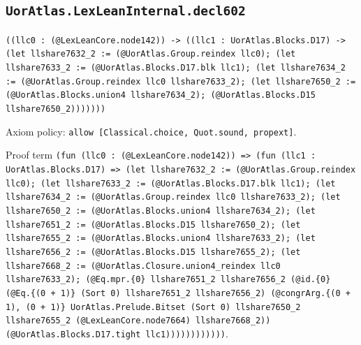 \documentclass[11pt]{article}
\begin{document}
\subsection*{\texttt{UorAtlas.LexLeanInternal.decl602}}
\noindent\texttt{((llc0 : (@LexLeanCore.node142)) -> ((llc1 : UorAtlas.Blocks.D17) -> (let llshare7632\_2 := (@UorAtlas.Group.reindex llc0); (let llshare7633\_2 := (@UorAtlas.Blocks.D17.blk llc1); (let llshare7634\_2 := (@UorAtlas.Group.reindex llc0 llshare7633\_2); (let llshare7650\_2 := (@UorAtlas.Blocks.union4 llshare7634\_2); (@UorAtlas.Blocks.D15 llshare7650\_2)))))))}\par
\noindent Axiom policy: \texttt{allow [Classical.choice, Quot.sound, propext]}.\par
\noindent Proof term \texttt{(fun (llc0 : (@LexLeanCore.node142)) => (fun (llc1 : UorAtlas.Blocks.D17) => (let llshare7632\_2 := (@UorAtlas.Group.reindex llc0); (let llshare7633\_2 := (@UorAtlas.Blocks.D17.blk llc1); (let llshare7634\_2 := (@UorAtlas.Group.reindex llc0 llshare7633\_2); (let llshare7650\_2 := (@UorAtlas.Blocks.union4 llshare7634\_2); (let llshare7651\_2 := (@UorAtlas.Blocks.D15 llshare7650\_2); (let llshare7655\_2 := (@UorAtlas.Blocks.union4 llshare7633\_2); (let llshare7656\_2 := (@UorAtlas.Blocks.D15 llshare7655\_2); (let llshare7668\_2 := (@UorAtlas.Closure.union4\_reindex llc0 llshare7633\_2); (@Eq.mpr.\{0\} llshare7651\_2 llshare7656\_2 (@id.\{0\} (@Eq.\{(0 + 1)\} (Sort 0) llshare7651\_2 llshare7656\_2) (@congrArg.\{(0 + 1), (0 + 1)\} UorAtlas.Prelude.Bitset (Sort 0) llshare7650\_2 llshare7655\_2 (@LexLeanCore.node7664) llshare7668\_2)) (@UorAtlas.Blocks.D17.tight llc1))))))))))))}.\par
\end{document}

